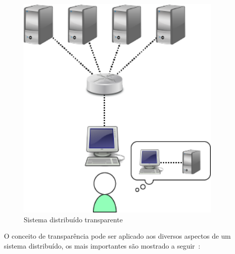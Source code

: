 	\begin{figure}[htb]
		\begin{center}
			
			\includegraphics[clip,width=10.0cm]{images/sad.png}
			\caption{Sistema distribuído transparente}
			\label{fig:transparente}
		\end{center}
	\end{figure}
	
	
	O conceito de transparência pode ser aplicado aos diversos aspectos de um sistema distribuído, os mais importantes são mostrado a seguir~\cite{tanenbaum07}:
	\\	


